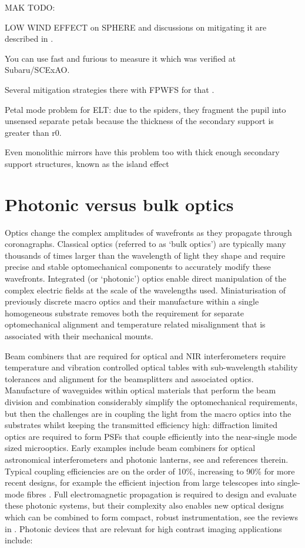 \documentclass[letterpaper]{ar-1col}
\begin{document}
MAK TODO:

LOW WIND EFFECT on SPHERE \citep{Sauvage16} and discussions on mitigating it are described in \citet{Milli18}.

You can use fast and furious to measure it \citep{Wilby18} which was verified at Subaru/SCExAO.

Several mitigation strategies there with FPWFS for that \citep{Vievard19}.

Petal mode problem for ELT: due to the spiders, they fragment the pupil into unsensed separate petals because the thickness of the secondary support is greater than r0.

Even monolithic mirrors have this problem too with thick enough secondary support structures, known as the island effect \citep{Leboulleux22,Leboulleux22a}

\section{Photonic versus bulk optics}

Optics change the complex amplitudes of wavefronts as they propagate through coronagraphs.
%
Classical optics (referred to as `bulk optics') are typically many thousands of times larger than the wavelength of light they shape and require precise and stable optomechanical components to accurately modify these wavefronts.
%
Integrated (or `photonic') optics enable direct manipulation of the complex electric fields at the scale of the wavelengths used.
%
Miniaturisation of previously discrete macro optics and their manufacture within a single homogeneous substrate removes both the requirement for separate optomechanical alignment and temperature related misalignment that is associated with their mechanical mounts.
%

Beam combiners that are required for optical and NIR interferometers require temperature and vibration controlled optical tables with sub-wavelength stability tolerances and alignment for the beamsplitters and associated optics.
%
Manufacture of waveguides within optical materials that perform the beam division and combination considerably simplify the optomechanical requirements, but then the challenges are in coupling the light from the macro optics into the substrates whilst keeping the transmitted efficiency high: diffraction limited optics are required to form PSFs that couple efficiently into the near-single mode sized microoptics.
%
Early examples include beam combiners for optical astronomical interferometers \citep[for example the IOTA/IONIC beam combiner; ][]{Berger01} and photonic lanterns, see \citet{Leon-Saval10} and references therein.
%
Typical coupling efficiencies are on the order of 10\%, increasing to 90\% for more recent designs, for example the efficient injection from large telescopes into single-mode fibres \citep{Jovanovic17}.
%
Full electromagnetic propagation is required to design and evaluate these photonic systems, but their complexity also enables new optical designs which can be combined to form compact, robust instrumentation, see the reviews in \citet{Minardi21,Jovanovic23}.
%
Photonic devices that are relevant for high contrast imaging applications include:
\end{document}
